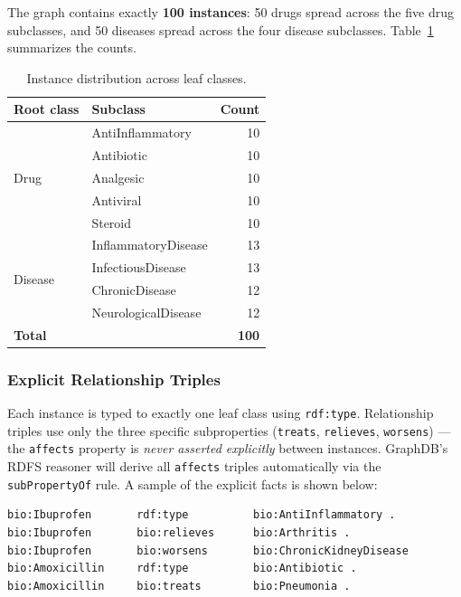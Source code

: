 \documentclass[11pt,a4paper]{article}
\begin{document}
The graph contains exactly \textbf{100 instances}: 50 drugs spread across the
five drug subclasses, and 50 diseases spread across the four disease subclasses.
Table~\ref{tab:instances} summarizes the counts.

\begin{table}[h!]
\centering
\caption{Instance distribution across leaf classes.}
\label{tab:instances}
\begin{tabular}{@{}llr@{}}
\toprule
\textbf{Root class} & \textbf{Subclass} & \textbf{Count} \\
\midrule
\multirow{5}{*}{Drug}    & AntiInflammatory & 10 \\
                         & Antibiotic       & 10 \\
                         & Analgesic        & 10 \\
                         & Antiviral        & 10 \\
                         & Steroid          & 10 \\
\midrule
\multirow{4}{*}{Disease} & InflammatoryDisease  & 13 \\
                         & InfectiousDisease    & 13 \\
                         & ChronicDisease       & 12 \\
                         & NeurologicalDisease  & 12 \\
\midrule
\multicolumn{2}{l}{\textbf{Total}} & \textbf{100} \\
\bottomrule
\end{tabular}
\end{table}

\subsubsection*{Explicit Relationship Triples}

Each instance is typed to exactly one leaf class using \texttt{rdf:type}.
Relationship triples use only the three specific subproperties (\texttt{treats},
\texttt{relieves}, \texttt{worsens}) — the \texttt{affects} property is
\emph{never asserted explicitly} between instances.  GraphDB's RDFS reasoner
will derive all \texttt{affects} triples automatically via the
\texttt{subPropertyOf} rule.  A sample of the explicit facts is shown below:

\begin{lstlisting}[style=turtle, caption={Sample Turtle triples from the facts layer.}]
bio:Ibuprofen       rdf:type          bio:AntiInflammatory .
bio:Ibuprofen       bio:relieves      bio:Arthritis .
bio:Ibuprofen       bio:worsens       bio:ChronicKidneyDisease 
bio:Amoxicillin     rdf:type          bio:Antibiotic .
bio:Amoxicillin     bio:treats        bio:Pneumonia .
\end{lstlisting}
\end{document}
